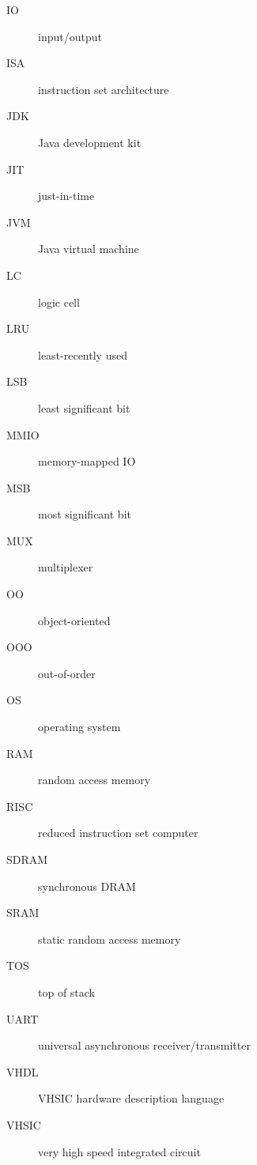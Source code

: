 \documentclass[%
    10pt,
    headinclude, footexclude,
    openright, %
    notitlepage,
    cleardoubleempty,
    headsepline,
    pointlessnumbers,
    bibtotoc, idxtotoc,
    ]{scrbook}
\begin{document}
\begin{description}
\item [IO] input/output
\item [ISA] instruction set architecture
\item [JDK] Java development kit
\item [JIT] just-in-time
\item [JVM] Java virtual machine
\item [LC] logic cell
\item [LRU] least-recently used
\item [LSB] least significant bit
\item [MMIO] memory-mapped IO
\item [MSB] most significant bit
\item [MUX] multiplexer
\item [OO] object-oriented
\item [OOO] out-of-order
\item [OS] operating system
\item [RAM] random access memory
\item [RISC] reduced instruction set computer
\item [SDRAM] synchronous DRAM
\item [SRAM] static random access memory
\item [TOS] top of stack
\item [UART] universal asynchronous receiver/transmitter
\item [VHDL] VHSIC hardware description language
\item [VHSIC] very high speed integrated circuit
\end{description}





\hypertarget{index}{}
\printindex
\end{document}
